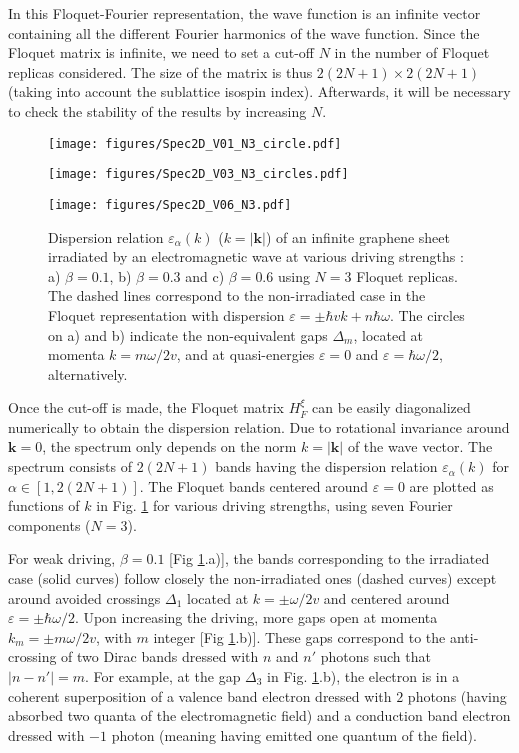 \documentclass[aps,prb,showpacs,superscriptaddress,twocolumn,10pt,floatfix]{revtex4-1}
\newcommand{\ep}{\varepsilon}
\begin{document}
In this Floquet-Fourier representation, the wave function is an infinite vector containing all the different Fourier harmonics of the wave function. Since the Floquet matrix is infinite, we need to set a cut-off $N$ in the number of Floquet replicas considered. The size of the matrix is thus $2(2N+1)\times2(2N+1)$ (taking into account the sublattice isospin index). Afterwards, it will be necessary to check the stability of the results by increasing $N$.


\begin{figure}[h!]
\texttt{[image: figures/Spec2D\_V01\_N3\_circle.pdf]}

\texttt{[image: figures/Spec2D\_V03\_N3\_circles.pdf]}

\texttt{[image: figures/Spec2D\_V06\_N3.pdf]}
\caption{ Dispersion relation $\varepsilon_\alpha(k)$ ($k=|\mathbf{k}|$) of an infinite graphene sheet irradiated by an electromagnetic wave at various driving strengths : a) $\beta=0.1$, b) $\beta=0.3$ and c) $\beta=0.6$ using $N=3$ Floquet replicas. The dashed lines correspond to the non-irradiated case in the Floquet representation with dispersion $\ep=\pm\hbar vk+n\hbar\omega$. The circles on a) and b) indicate the non-equivalent gaps $\Delta_m$, located at momenta $k=m\omega/2v$, and at quasi-energies $\ep=0$ and $\ep=\hbar\omega/2$, alternatively. }
\label{fig:spectrum}
\end{figure}


Once the cut-off is made, the Floquet matrix $H_{F}^\xi$ can be easily diagonalized numerically to obtain the dispersion relation. Due to rotational invariance around $\mathbf{k}=0$, the spectrum only depends on the norm $k=|\mathbf{k}|$ of the wave vector. The spectrum consists of $2(2N+1)$ bands having the dispersion relation $\varepsilon_\alpha(k)$ for $\alpha\in[1,2(2N+1)]$. The Floquet bands centered around $\varepsilon=0$ are plotted as functions of $k$ in Fig. \ref{fig:spectrum} for various driving strengths, using seven Fourier components ($N=3$).

For weak driving, $\beta=0.1$ [Fig \ref{fig:spectrum}.a)], the bands corresponding to the irradiated case (solid curves) follow closely the non-irradiated ones (dashed curves) except around avoided crossings $\Delta_1$ located at $k=\pm \omega/2v$ and centered around $\ep=\pm \hbar \omega/2$. Upon increasing the driving, more gaps open at momenta $k_m=\pm m\omega/2v$, with $m$ integer [Fig \ref{fig:spectrum}.b)]. These gaps correspond to the anti-crossing of two Dirac bands dressed with $n$ and $n'$ photons such that $|n-n'|=m$. For example, at the gap $\Delta_3$ in Fig. \ref{fig:spectrum}.b), the electron is in a coherent superposition of a valence band electron dressed with $2$ photons (having absorbed two quanta of the electromagnetic field) and a conduction band electron dressed with $-1$ photon (meaning having emitted one quantum of the field).
\end{document}
